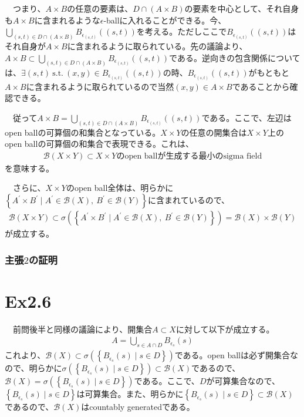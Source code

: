 \documentclass{article}
\begin{document}
　つまり、$A\times B$の任意の要素は、$D\cap (A\times B)$の要素を中心として、それ自身も$A\times B$に含まれるような$\epsilon$-ballに入れることができる。今、$\bigcup_{(s,t)\in D\cap(A\times B)} B_{\epsilon_{(s,t)}}((s,t))$を考える。ただしここで$B_{\epsilon_{(s,t)}}((s,t))$はそれ自身が$A\times B$に含まれるように取られている。先の議論より、$A\times B \subset \bigcup_{(s,t)\in D\cap(A\times B)} B_{\epsilon_{(s,t)}}((s,t))$である。逆向きの包含関係については、$\exists (s,t)\ \text{s.t.}\ (x, y)\in B_{\epsilon_{(s,t)}}((s,t))$の時、$B_{\epsilon_{(s,t)}}((s,t))$がもともと$A\times B$に含まれるように取られているので当然$(x, y)\in A\times B$であることから確認できる。

　従って$A\times B = \bigcup_{(s,t)\in D\cap(A\times B)} B_{\epsilon_{(s,t)}}((s,t))$である。ここで、左辺はopen ballの可算個の和集合となっている。$X\times Y$の任意の開集合は$X\times Y$上のopen ballの可算個の和集合で表現できる。これは、
\begin{align*}
\mathcal{B}(X\times Y) \subset \text{$X\times Y$のopen ballが生成する最小のsigma field}
\end{align*}
を意味する。

　さらに、$X\times Y$のopen ball全体は、明らかに$\left\{ A^{'} \times B^{'} \mid A^{'} \in \mathcal{B}(X),\ B^{'} \in \mathcal{B}(Y) \right\}$に含まれているので、
\begin{align*}
	\mathcal{B}(X\times Y) \subset \sigma\left( \left\{ A^{'} \times B^{'} \mid A^{'} \in \mathcal{B}(X),\ B^{'} \in \mathcal{B}(Y) \right\} \right) = \mathcal{B}(X)\times\mathcal{B}(Y)
\end{align*}
が成立する。

\subsubsection{主張$2$の証明}

\section{Ex2.6}
　前問後半と同様の議論により、開集合$A\subset X$に対して以下が成立する。
\begin{align*}
	A = \bigcup_{s\in A\cap D} B_{\epsilon_s}(s)
\end{align*}
これより、$\mathcal{B}(X)\subset \sigma\left( \left\{ B_{\epsilon_s}(s)\mid s\in D \right\} \right)$である。open ballは必ず開集合なので、明らかに$\sigma\left( \left\{ B_{\epsilon_s}(s)\mid s\in D \right\} \right) \subset \mathcal{B}(X)$であるので、$\mathcal{B}(X) = \sigma\left( \left\{ B_{\epsilon_s}(s)\mid s\in D \right\} \right)$である。ここで、$D$が可算集合なので、$\left\{ B_{\epsilon_s}(s)\mid s\in D \right\}$は可算集合。また、明らかに$\left\{ B_{\epsilon_s}(s)\mid s\in D \right\} \subset \mathcal{B}(X)$であるので、$\mathcal{B}(X)$はcountably generatedである。
\end{document}
